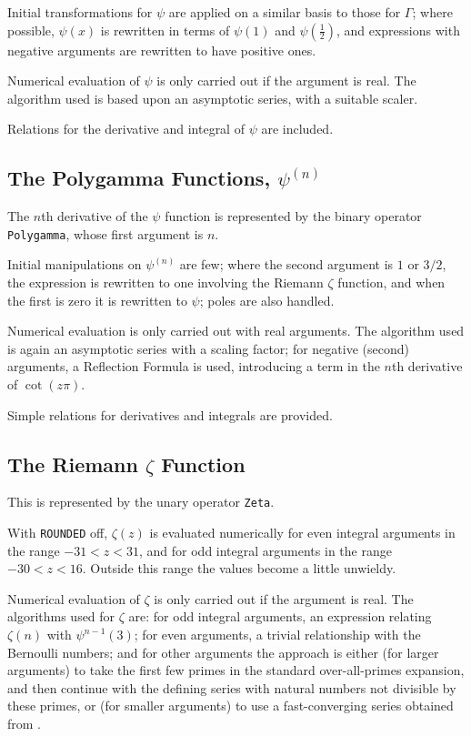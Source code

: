 Initial transformations for $\psi$ are applied on a similar basis to
those for $\Gamma$; where possible, $\psi(x)$ is rewritten in
terms of $\psi(1)$ and $\psi(\frac{1}{2})$, and expressions with negative
arguments are rewritten to have positive ones.

Numerical evaluation of $\psi$ is only carried out if the argument is
real. The algorithm used is based upon an asymptotic series, with a
suitable scaler.

Relations for the derivative and integral of $\psi$ are included.


\subsection{The Polygamma Functions, $\psi^{(n)}$}

The $n$th derivative of the $\psi$ function is represented by the
binary operator {\tt Polygamma}, whose first argument is $n$.

Initial manipulations on $\psi^{(n)}$ are few; where the second argument
is $1$ or $3/2$, the expression is rewritten to one involving the
Riemann $\zeta$ function, and when the first is zero it is rewritten to
$\psi$; poles are also handled.

Numerical evaluation is only carried out with real arguments. The
algorithm used is again an asymptotic series with a scaling factor; for
negative (second) arguments, a Reflection Formula is used, introducing a
term in the $n$th derivative of $\cot(z\pi)$.

Simple relations for derivatives and integrals are provided.


\subsection{The Riemann $\zeta$ Function}

This is represented by the unary operator {\tt Zeta}.

With {\tt ROUNDED} off, $\zeta(z)$ is evaluated numerically for even
integral arguments in the range $-31 < z < 31$, and for odd integral
arguments in the range $-30 < z < 16$.  Outside this range the values
become a little unwieldy.

Numerical evaluation of $\zeta$ is only carried out if the argument is real.
The algorithms used for $\zeta$ are: for odd integral arguments, an
expression relating $\zeta(n)$ with $\psi^{n-1}(3)$; for even arguments, a
trivial relationship with the Bernoulli numbers; and for other arguments the
approach is either (for larger arguments) to take the first few primes in
the standard over-all-primes expansion, and then continue with the defining
series with natural numbers not divisible by these primes, or (for smaller
arguments) to use a fast-converging series obtained from \cite{Bender:78}.

